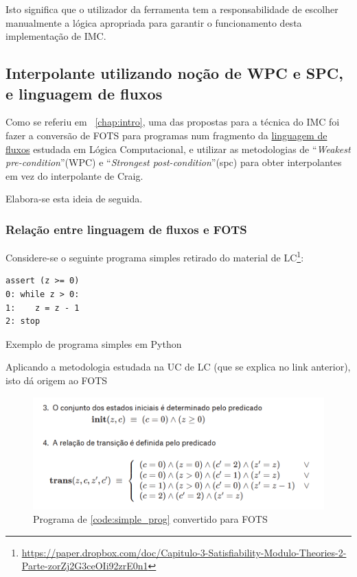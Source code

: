 \documentclass[11pt,a4paper]{report}%
\newenvironment{code}{\captionsetup{type=listing}}{}
\def\lc{Lógica Computacional\xspace}
\def\wpc{``\textit{Weakest pre-condition}''\xspace}
\def\spc{``\textit{Strongest post-condition}''\xspace}
\begin{document}
Isto significa que o utilizador da ferramenta tem a responsabilidade de escolher
manualmente a lógica apropriada para garantir o funcionamento desta implementação
de IMC.

\subsection{Interpolante utilizando noção de WPC e SPC, e linguagem de fluxos}
\label{imc_wpc_spc}

Como se referiu em ~\ref{chap:intro}, uma das propostas para a técnica do IMC
foi fazer a conversão de FOTS para programas num fragmento da \href{https://paper.dropbox.com/doc/Capitulo-5-Verificacao-Formal-de-Software-e95D7fVpc0dArh4pnVl1l#:uid=847823822173927851567448&h2=Denota%C3%A7%C3%A3o-WPC-e-sua-linguagem-}{linguagem de fluxos} estudada em \lc, e utilizar as metodologias de \wpc (WPC) e \spc (spc)
para obter interpolantes em vez do interpolante de Craig.

Elabora-se esta ideia de seguida.

\subsubsection{Relação entre linguagem de fluxos e FOTS}

Considere-se o seguinte programa simples retirado do material de LC\footnote{\url{https://paper.dropbox.com/doc/Capitulo-3-Satisfiability-Modulo-Theories-2-Parte-zorZj2G3ceOIi92zrE0n1}}:

\begin{code}
\begin{verbatim}
assert (z >= 0)
0: while z > 0:
1:    z = z - 1
2: stop
\end{verbatim}
\caption{Exemplo de programa simples em Python}
\label{code:simple_prog}
\end{code}

Aplicando a metodologia estudada na UC de LC (que se explica no link anterior), isto dá
origem ao FOTS

\begin{figure}[H]
      \centering
      \includegraphics[scale=0.85]{simple_prog.png}
      \caption{Programa de \ref{code:simple_prog} convertido para FOTS}
      \label{fig:simple_fots}
\end{figure}
\end{document}
